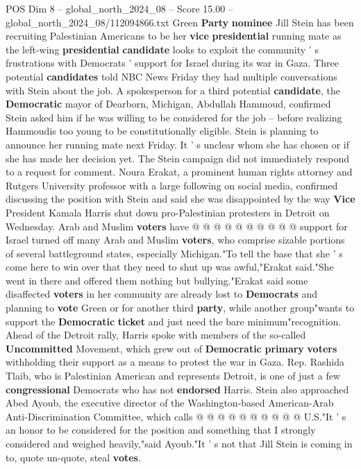 \begin{textsample}{POS Dim 8 – global\_north\_2024\_08 – Score 15.00 – global\_north\_2024\_08/112094866.txt}  \label{ex:f8_pos_033}
Green \textbf{Party} \textbf{nominee} Jill Stein has been recruiting Palestinian Americans to be her \textbf{vice} \textbf{presidential} running mate as the left-wing \textbf{presidential} \textbf{candidate} looks to exploit the community ' s frustrations with Democrats ' support for Israel during its war in Gaza.
Three potential \textbf{candidates} told NBC News Friday they had multiple conversations with Stein about the job.
A spokesperson for a third potential \textbf{candidate}, the \textbf{Democratic} mayor of Dearborn, Michigan, Abdullah Hammoud, confirmed Stein asked him if he was willing to be considered for the job -- before realizing Hammoudis too young to be constitutionally eligible.
Stein is planning to announce her running mate next Friday.
It ' s unclear whom she has chosen or if she has made her decision yet.
The Stein campaign did not immediately respond to a request for comment.
Noura Erakat, a prominent human rights attorney and Rutgers University professor with a large following on social media, confirmed discussing the position with Stein and said she was disappointed by the way \textbf{Vice} President Kamala Harris shut down pro-Palestinian protesters in Detroit on Wednesday.
Arab and Muslim \textbf{voters} have @ @ @ @ @ @ @ @ @ @ support for Israel turned off many Arab and Muslim \textbf{voters}, who comprise sizable portions of several battleground states, especially Michigan."To tell the base that she ' s come here to win over that they need to shut up was awful,"Erakat said."She went in there and offered them nothing but bullying."Erakat said some disaffected \textbf{voters} in her community are already lost to \textbf{Democrats} and planning to \textbf{vote} Green or for another third \textbf{party}, while another group"wants to support the \textbf{Democratic} \textbf{ticket} and just need the bare minimum"recognition.
Ahead of the Detroit rally, Harris spoke with members of the so-called \textbf{Uncommitted} Movement, which grew out of \textbf{Democratic} \textbf{primary} \textbf{voters} withholding their support as a means to protest the war in Gaza.
Rep.
Rashida Tlaib, who is Palestinian American and represents Detroit, is one of just a few \textbf{congressional} Democrats who has not \textbf{endorsed} Harris.
Stein also approached Abed Ayoub, the executive director of the Washington-based American-Arab Anti-Discrimination Committee, which calls @ @ @ @ @ @ @ @ @ @ U.S."It ' s an honor to be considered for the position and something that I strongly considered and weighed heavily,"said Ayoub."It ' s not that Jill Stein is coming in to, quote un-quote, steal \textbf{votes}.

\end{textsample}
